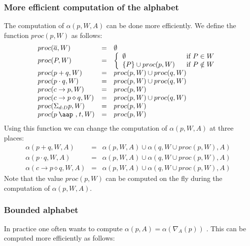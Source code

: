 \documentclass{article}
\providecommand{\at}{\mathbin{\mbox{\aap ,}}}
\begin{document}
\subsubsection{More efficient computation of the alphabet}

The computation of $\alpha (p,W,A)$ can be done more efficiently. We define
the function $proc(p,W)$ as follows:%
\[
\begin{array}{lll}
proc(\overline{a},W) & = & \emptyset \\ 
proc(P,W) & = & \left\{ 
\begin{array}{ll}
\emptyset & \text{if }P\in W \\ 
\{P\}\cup proc(p,W) & \text{if }P\notin W%
\end{array}%
\right. \\ 
proc(p+q,W) & = & proc(p,W)\cup proc(q,W) \\ 
proc(p\cdot q,W) & = & proc(p,W)\cup proc(q,W) \\ 
proc(c\rightarrow p,W) & = & proc(p,W) \\ 
proc(c\rightarrow p\diamond q,W) & = & proc(p,W)\cup proc(q,W) \\ 
proc(\Sigma _{d:D}p,W) & = & proc(p,W) \\ 
proc(p\at t,W) & = & proc(p,W)%
\end{array}%
\]%
Using this function we can change the computation of $\alpha (p,W,A)$ at
three places:%
\[
\begin{array}{lll}
\alpha (p+q,W,A) & = & \alpha (p,W,A)\cup \alpha (q,W\cup proc(p,W),A) \\ 
\alpha (p\cdot q,W,A) & = & \alpha (p,W,A)\cup \alpha (q,W\cup proc(p,W),A)
\\ 
\alpha (c\rightarrow p\diamond q,W,A) & = & \alpha (p,W,A)\cup \alpha
(q,W\cup proc(p,W),A)%
\end{array}%
\]%
Note that the value $proc(p,W)$ can be computed on the fly during the
computation of $\alpha (p,W,A)$.

\subsubsection{Bounded alphabet}

In practice one often wants to compute $\alpha (p,A)=\alpha (\nabla _{A}(p))$%
. This can be computed more efficiently as follows:
\end{document}
